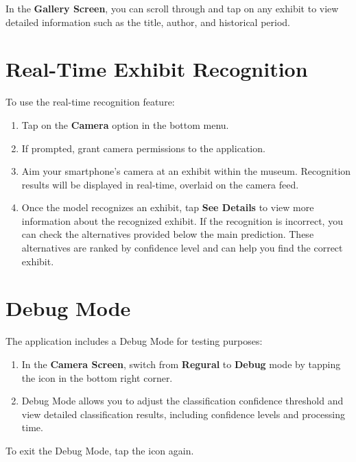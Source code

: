 In the \textbf{Gallery Screen}, you can scroll through and tap on any exhibit to view detailed information such as the title, author, and historical period.

\section{Real-Time Exhibit Recognition}

To use the real-time recognition feature:

\begin{enumerate}
\item Tap on the \textbf{Camera} option in the bottom menu.
\item If prompted, grant camera permissions to the application.
\item Aim your smartphone's camera at an exhibit within the museum. Recognition results will be displayed in real-time, overlaid on the camera feed.
\item Once the model recognizes an exhibit, tap \textbf{See Details} to view more information about the recognized exhibit. If the recognition is incorrect, you can check the alternatives provided below the main prediction. These alternatives are ranked by confidence level and can help you find the correct exhibit.
\end{enumerate}

\section{Debug Mode}

The application includes a Debug Mode for testing purposes:

\begin{enumerate}
\item In the \textbf{Camera Screen}, switch from \textbf{Regural} to \textbf{Debug} mode by tapping the icon in the bottom right corner.
\item Debug Mode allows you to adjust the classification confidence threshold and view detailed classification results, including confidence levels and processing time.
\end{enumerate}

To exit the Debug Mode, tap the icon again.